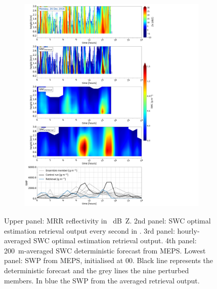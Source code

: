     \begin{figure}\ContinuedFloat
   		\centering
		\begin{subfigure}[b]{0.8\textwidth}
			\includegraphics[trim={0.5cm 0.5cm 17.5cm .5cm},clip,width=\textwidth]{./fig_SWC/20161226}
			\caption{}\label{fig:SWC26}
		\end{subfigure}
        \caption{Upper panel: MRR reflectivity in \SI{}{\dB Z}. 2nd panel: SWC optimal estimation retrieval output every second in \SI{}{\SWC}. 3rd panel: hourly-averaged SWC optimal estimation retrieval output. 4th panel: \SI{200}{\metre}-averaged SWC deterministic forecast from MEPS. Lowest panel: SWP from MEPS, initialised at \SI{00}{\UTC}. Black line represents the deterministic forecast and the grey lines the nine perturbed members. In blue the SWP from the averaged retrieval output.}\label{fig:SWC}
	\end{figure}
	
